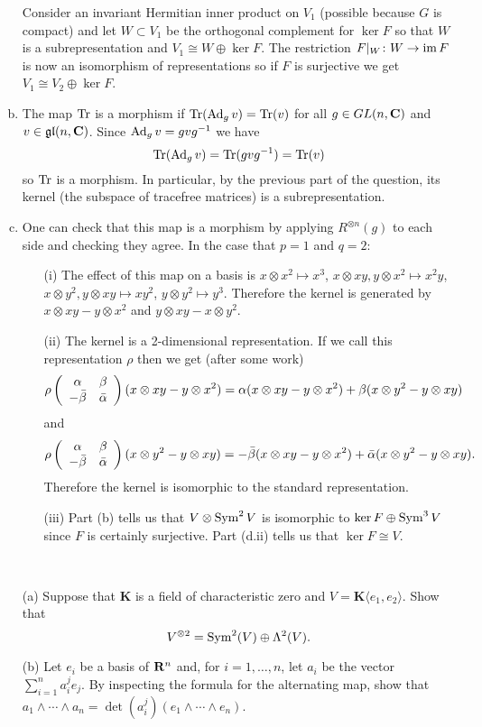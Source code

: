 \documentclass[12pt]{article}
\begin{document}
\begin{answer}
\begin{enumerate}[(a)]
Consider an invariant Hermitian inner product on $V_1$ (possible because $G$ is compact) and let $W\subset V_1$ be the orthogonal complement for $\ker F$ so that $W$ is a subrepresentation and $V_1\cong W\oplus \ker F$. The restriction $F|_W\colon W\to \operatorname{im} F$ is now an isomorphism of representations so if $F$ is surjective we get $V_1\cong V_2\oplus\ker F$.
\item The map $\operatorname{Tr}$ is a morphism if $\operatorname{Tr}(\operatorname{Ad}_gv)=\operatorname{Tr}(v)$ for all $g\in GL(n,\mathbf{C})$ and $v\in\mathfrak{gl}(n,\mathbf{C})$. Since $\operatorname{Ad}_gv=gvg^{-1}$ we have
\[\operatorname{Tr}(\operatorname{Ad}_gv)=\operatorname{Tr}(gvg^{-1})=\operatorname{Tr}(v)\]
so $\operatorname{Tr}$ is a morphism. In particular, by the previous part of the question, its kernel (the subspace of tracefree matrices) is a subrepresentation.
\item One can check that this map is a morphism by applying $R^{\otimes n}(g)$ to each side and checking they agree. In the case that $p=1$ and $q=2$:
\begin{enumerate}
\item[(i)] The effect of this map on a basis is $x\otimes x^2\mapsto x^3$, $x\otimes xy,y\otimes x^2\mapsto x^2y$, $x\otimes y^2,y\otimes xy\mapsto xy^2$, $y\otimes y^2\mapsto y^3$. Therefore the kernel is generated by $x\otimes xy-y\otimes x^2$ and $y\otimes xy-x\otimes y^2$.
\item[(ii)] The kernel is a 2-dimensional representation. If we call this representation $\rho$ then we get (after some work)
\[\rho\left(\begin{array}{cc}\alpha & \beta\\ -\bar{\beta} & \bar{\alpha}\end{array}\right)(x\otimes xy-y\otimes x^2)=\alpha(x\otimes xy-y\otimes x^2)+\beta(x\otimes y^2-y\otimes xy)\]
and
\[\rho\left(\begin{array}{cc}\alpha & \beta\\ -\bar{\beta} & \bar{\alpha}\end{array}\right)(x\otimes y^2-y\otimes xy)=-\bar{\beta}(x\otimes xy-y\otimes x^2)+\bar{\alpha}(x\otimes y^2-y\otimes xy).\]
Therefore the kernel is isomorphic to the standard representation.
\item[(iii)] Part (b) tells us that $V\otimes \operatorname{Sym}^2V$ is isomorphic to $\ker F\oplus \operatorname{Sym}^3V$ since $F$ is certainly surjective. Part (d.ii) tells us that $\ker F\cong V$.
\end{enumerate}
\end{enumerate}
\end{answer}
\fi
\newpage

\begin{question}\ \\
\begin{enumerate}
\item[(a)] Suppose that $\mathbf{K}$ is a field of characteristic zero and $V=\mathbf{K}\langle e_1,e_2\rangle$. Show that
\[V^{\otimes 2}=\operatorname{Sym}^2(V)\oplus\Lambda^2(V).\]
\item[(b)] Let $e_i$ be a basis of $\mathbf{R}^n$ and, for $i=1,\ldots,n$, let $a_i$ be the vector $\sum_{i=1}^n a_i^je_j$. By inspecting the formula for the alternating map, show that $a_1\wedge\cdots\wedge a_n=\det(a^j_i)(e_1\wedge\cdots\wedge e_n)$.
\end{enumerate}
\end{question}
\end{document}

